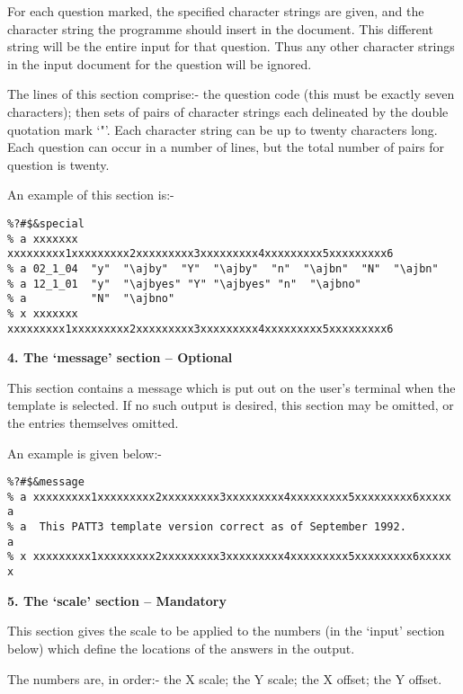 For each question marked, the specified character strings are given, and
the character string the programme should insert in the document. This
different string will be the entire input for that question. Thus any other
character strings in the input document for the question will be ignored. 

The lines of this section comprise:- the question code (this must be
exactly seven characters); then sets of  pairs of character strings each
delineated by the double quotation mark `"'. Each character string can be
up to twenty characters long. Each question can occur in a number of lines,
but the total number of pairs for question is twenty. 

An example of this section is:-

\begin{verbatim}
%?#$&special
% a xxxxxxx xxxxxxxxx1xxxxxxxxx2xxxxxxxxx3xxxxxxxxx4xxxxxxxxx5xxxxxxxxx6
% a 02_1_04  "y"  "\ajby"  "Y"  "\ajby"  "n"  "\ajbn"  "N"  "\ajbn"
% a 12_1_01  "y"  "\ajbyes" "Y" "\ajbyes" "n"  "\ajbno"
% a          "N"  "\ajbno"
% x xxxxxxx xxxxxxxxx1xxxxxxxxx2xxxxxxxxx3xxxxxxxxx4xxxxxxxxx5xxxxxxxxx6
\end{verbatim}

\vspace*{0.2cm}
{\bf \large 4. The `message' section -- Optional}
\vspace*{0.2cm}

This section contains a message which is put out on the user's terminal
when the template is selected. If no such output is desired, this section
may be omitted, or the entries themselves omitted. 

An example is given below:- 

\begin{verbatim}
%?#$&message
% a xxxxxxxxx1xxxxxxxxx2xxxxxxxxx3xxxxxxxxx4xxxxxxxxx5xxxxxxxxx6xxxxx a
% a  This PATT3 template version correct as of September 1992.        a
% x xxxxxxxxx1xxxxxxxxx2xxxxxxxxx3xxxxxxxxx4xxxxxxxxx5xxxxxxxxx6xxxxx x
\end{verbatim}

\vspace*{0.2cm}
{\bf \large 5. The `scale' section -- Mandatory}
\vspace*{0.2cm}

This section gives the scale to be applied to the numbers (in the `input'
section below) which define the locations of the answers in the output.

The numbers are, in order:- the X scale; the Y scale; the X offset; the Y
offset. 

